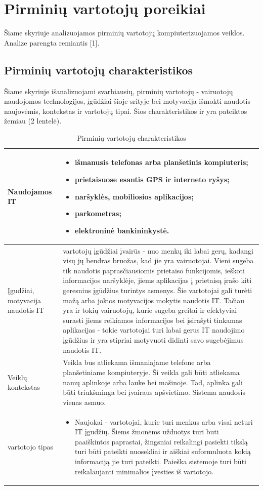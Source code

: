 \documentclass{VUMIFPSkursinis}
\begin{document}
\section{Pirminių vartotojų poreikiai}
Šiame skyriuje analizuojamos pirminių vartotojų kompiuterizuojamos veiklos. Analize parengta remiantis [1].
\subsection{Pirminių vartotojų charakteristikos}

Šiame skyriuje išanalizuojami svarbiausių, pirminių vartotojų - vairuotojų naudojomos technologijos, įgūdžiai šioje srityje bei motyvacija išmokti naudotis naujovėmis, kontekstas ir vartotojų tipai. Šios charakteristikos ir yra pateiktos žemiau (2 lentelė).
\begin{table}[H]\footnotesize
  \centering
  \caption{Pirminių vartotojų charakteristikos}
  {\begin{tabular}{|p{}|p{}|} 
	\hline
	Naudojamos IT  & \begin{itemize}
						  \item išmanusis telefonas arba planšetinis kompiuteris;
						  \item	prietaisuose esantis GPS ir interneto ryšys;
						  \item	naršyklės, mobiliosios aplikacijos;
						  \item	parkometras;
						  \item	elektroninė bankininkystė.
					  \end{itemize}
					  \\
	\hline
    Įgudžiai, motyvacija naudotis IT  & vartotojų įgūdžiai įvairūs - nuo menkų iki labai gerų, kadangi visų jų bendras bruožas, kad jie yra vairuotojai. Vieni sugeba tik naudotis paprasčiausiomis prietaiso funkcijomis, ieškoti informacijos naršyklėje, jiems aplikacijas į prietaisą įrašo kiti geresnius įgūdžius turintys asmenys. Šie vartotojai gali turėti mažą arba jokios motyvacijos mokytis naudotis IT. Tačiau yra ir tokių vairuotojų, kurie sugeba greitai ir efektyviai surasti jiems reikiamos informacijos bei įsirašyti tinkamas aplikacijas - tokie vartotojai turi labai gerus IT naudojimo įgūdžius ir yra stipriai motyvuoti didinti savo sugebėjimus naudotis IT.   \\
	\hline
    Veiklų kontekstas	& Veikla bus atliekama išmaniajame telefone arba planšetiniame kompiuteryje. Ši veikla gali būti atliekama namų aplinkoje arba lauke bei mašinoje. Tad, aplinka gali būti triukšminga bei įvairaus apšvietimo. Sistema naudosis vienas asmuo.     	    		  \\
	\hline
    vartotojo tipas 	 & \begin{itemize}
							  \item Naujokai - vartotojai, kurie turi menkus arba visai neturi IT įgūdžių. Šiems žmonėms užduotys turi būti paaiškintos paprastai, žingsniai reikalingi pasiekti tikslą turi būti pateikti nuosekliai ir aiškiai suformuluota kokią informaciją jie turi pateikti. Paieška sistemoje turi būti reikalaujanti minimalios įvesties iš vartotojo.


\end{itemize}
\end{tabular}}
\end{table}
\end{document}
